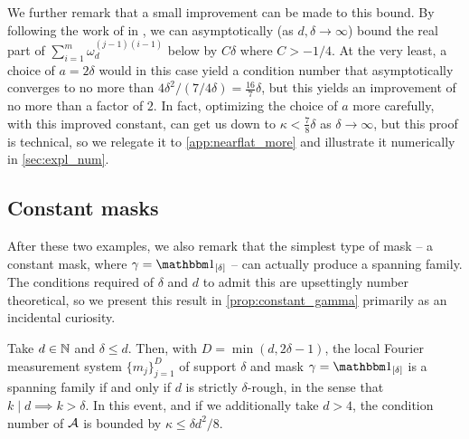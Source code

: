 We further remark that a small improvement can be made to this bound.  By following the work of \citeauthor{mercerXXXXdirichlet} in \cite{mercerXXXXdirichlet}, we can asymptotically (as $d, \delta \to \infty$) bound the real part of $\sum_{i = 1}^m \omega_d^{(j - 1)(i - 1)}$ below by $C \delta$ where $C > - 1 / 4$.  At the very least, a choice of $a = 2 \delta$ would in this case yield a condition number that asymptotically converges to no more than $4 \delta^2 / (7 / 4 \delta) = \frac{16}{7} \delta$, but this yields an improvement of no more than a factor of $2$.  In fact, optimizing the choice of $a$ more carefully, with this improved constant, can get us down to $\kappa < \frac{7}{8} \delta$ as $\delta \to \infty$, but this proof is technical, so we relegate it to \cref{app:nearflat_more} and illustrate it numerically in \cref{sec:expl_num}.


\subsection{Constant masks}
\label{sec:const_mask}
After these two examples, we also remark that the simplest type of mask -- a constant mask, where $\gamma = \one_{[\delta]}$ -- can actually produce a spanning family.  The conditions required of $\delta$ and $d$ to admit this are upsettingly number theoretical, so we present this result in \cref{prop:constant_gamma} primarily as an incidental curiosity.

\begin{proposition}
  Take $d \in \mathbb{N}$ and $\delta \le d$.  Then, with $D = \min(d, 2 \delta - 1)$, the local Fourier measurement system $\{m_j\}_{j = 1}^D$ of support $\delta$ and mask $\gamma = \one_{[\delta]}$ is a spanning family if and only if $d$ is strictly $\delta$-rough, in the sense that $k \mid d \implies k > \delta$.  In this event, and if we additionally take $d > 4$, the condition number of $\mathcal{A}$ is bounded by $\kappa \le \delta d^2 / 8$.
  \label{prop:constant_gamma}
\end{proposition}

